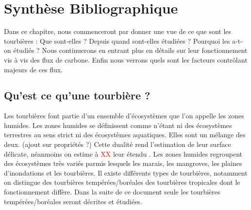 
%	
%

\chapter{Synth\`{e}se Bibliographique}
\newpage


Dans ce chapitre, nous commenceront par donner une vue de ce que sont les tourbières : Que sont-elles ? Depuis quand sont-elles étudiées ? Pourquoi les a-t-on étudiés ?
Nous continuerons en entrant plus en détails sur leur fonctionnement vis à vis des flux de carbone.
Enfin nous verrons quels sont les facteurs contrôlant majeurs de ces flux.
\section{Qu'est ce qu'une tourbière ?}
Les tourbières font partie d'un ensemble d'écosystèmes que l'on appelle les zones humides.
Les zones humides se définissent comme n'étant ni des écosystèmes terrestres au sens strict ni des écosystèmes aquatiques.
Elles sont un mélange des deux. (ajout sur propriétés ?)
Cette dualité rend l'estimation de leur surface délicate, néanmoins on estime à \textcolor{red}{XX} leur étendu \plop.
Les zones humides regroupent des écosystèmes très variés parmis lesquels les marais, les mangroves, les plaines d'inondations et les tourbières.
Il existe différents types de tourbières, notamment on distingue des tourbières tempérées/boréales des tourbières tropicales dont le fonctionnement diffère.
Dans la suite de ce document seule les tourbières tempérées/boréales seront décrites et étudiées.

